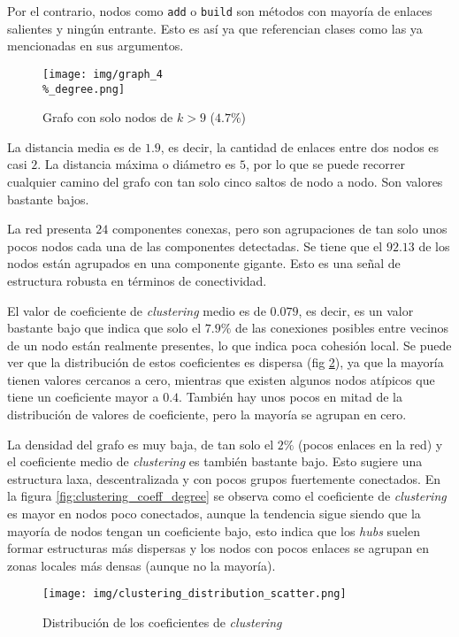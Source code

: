 \documentclass[12pt,letterpaper]{article}
\begin{document}
Por el contrario, nodos como \texttt{add} o \texttt{build} son métodos con mayoría de enlaces salientes y ningún entrante. Esto es así ya que referencian clases como las ya mencionadas en sus argumentos.

\begin{figure}[htp]
    \centering
    \texttt{[image: img/graph\_4\\\%\_degree.png]}
    \caption{Grafo con solo nodos de $k>9$ ($4.7\%$)}
    \label{fig:graph_4_filtered}
\end{figure}

La distancia media es de $1.9$, es decir, la cantidad de enlaces entre dos nodos es casi $2$. La distancia máxima o diámetro es $5$, por lo que se puede recorrer cualquier camino del grafo con tan solo cinco saltos de nodo a nodo. Son valores bastante bajos.

La red presenta $24$ componentes conexas, pero son agrupaciones de tan solo unos pocos nodos cada una de las componentes detectadas. Se tiene que el $92.13$ de los nodos están agrupados en una componente gigante. Esto es una señal de estructura robusta en términos de conectividad.

El valor de coeficiente de \textit{clustering} medio es de $0.079$, es decir, es un valor bastante bajo que indica que solo el $7.9\%$ de las conexiones posibles entre vecinos de un nodo están realmente presentes, lo que indica poca cohesión local. Se puede ver que la distribución de estos coeficientes es dispersa (fig \ref{fig:clustering_coeff}), ya que la mayoría tienen valores cercanos a cero, mientras que existen algunos nodos atípicos que tiene un coeficiente mayor a $0.4$. También hay unos pocos en mitad de la distribución de valores de coeficiente, pero la mayoría se agrupan en cero.

La densidad del grafo es muy baja, de tan solo el $2\%$ (pocos enlaces en la red) y el coeficiente medio de \textit{clustering} es también bastante bajo. Esto sugiere una estructura laxa, descentralizada y con pocos grupos fuertemente conectados. En la figura \ref{fig:clustering_coeff_degree} se observa como el coeficiente de \textit{clustering} es mayor en nodos poco conectados, aunque la tendencia sigue siendo que la mayoría de nodos tengan un coeficiente bajo, esto indica que los \textit{hubs} suelen formar estructuras más dispersas y los nodos con pocos enlaces se agrupan en zonas locales más densas (aunque no la mayoría).

\begin{figure}[htp]
    \centering
    \texttt{[image: img/clustering\_distribution\_scatter.png]}
    \caption{Distribución de los coeficientes de \textit{clustering}}
    \label{fig:clustering_coeff}
\end{figure}
\end{document}
